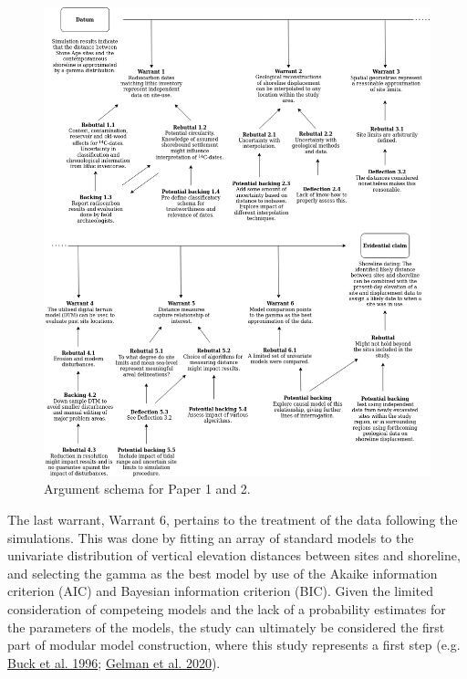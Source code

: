\documentclass[
  12pt,
  a4paper,
  oneside]{book}
\begin{document}
\begin{figure}

{\centering \includegraphics[width=1.05\linewidth]{figures/toulmin_p1} 

}

\caption{Argument schema for Paper 1 and 2.}\label{fig:t1}
\end{figure}

The last warrant, Warrant 6, pertains to the treatment of the data following the simulations. This was done by fitting an array of standard models to the univariate distribution of vertical elevation distances between sites and shoreline, and selecting the gamma as the best model by use of the Akaike information criterion (AIC) and Bayesian information criterion (BIC). Given the limited consideration of competeing models and the lack of a probability estimates for the parameters of the models, the study can ultimately be considered the first part of modular model construction, where this study represents a first step (e.g. \protect\hyperlink{ref-buck1996}{Buck et al. 1996}; \protect\hyperlink{ref-gelman2020}{Gelman et al. 2020}).
\end{document}
